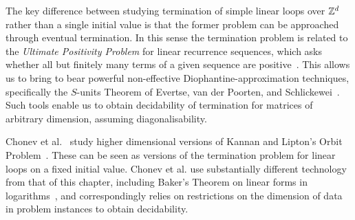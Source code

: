 The key difference between studying termination of simple linear loops
over $\mathbb{Z}^{d}$ rather than a single initial value is that the
former problem can be approached through eventual termination.  In
this sense the termination problem is related to the \emph{Ultimate
  Positivity Problem} for linear recurrence sequences, which asks
whether all but finitely many terms of a given sequence are
positive~\cite{OuaknineW13b}.  This allows us to bring to bear powerful
non-effective Diophantine-approximation techniques,
specifically the $S$-units Theorem of Evertse, van der Poorten, and
Schlickewei~\cite{Evertse84,PS82}.  Such tools enable us to obtain
decidability of termination for matrices of arbitrary dimension,
assuming diagonalisability.

Chonev et al.~\cite{COW13} study higher dimensional versions of
Kannan and Lipton's Orbit Problem~\cite{KL86}.  These can be seen as
versions of the termination problem for linear loops on a fixed
initial value.  Chonev et al. use substantially different technology from
that of this chapter, including Baker's Theorem on linear forms
in logarithms~\cite{BW93}, and correspondingly relies on restrictions
on the dimension of data in problem instances to obtain decidability.

